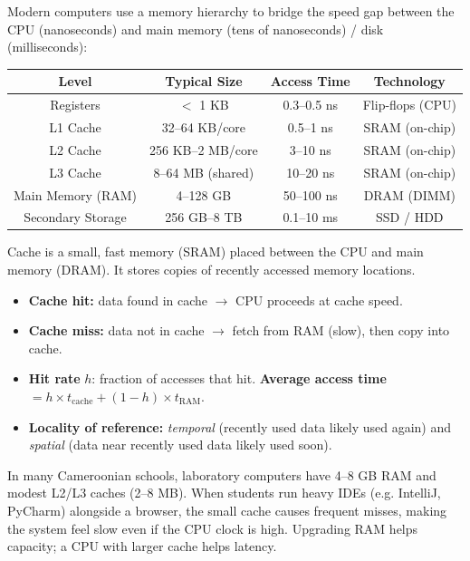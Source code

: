 \documentclass[11pt]{article}
\newcommand{\cle}[1]{{\popxbold\color{popdark}#1}}
\newcounter{popsec}
\newcounter{popsub}
\newcommand{\courssub}[1]{%
  \stepcounter{popsub}%
  \par\vspace{9pt}\noindent{\popxbold\fontsize{11.5}{13}\selectfont\color{popink}{\color{poporange}\thepopsec.\thepopsub}\hspace{6pt}#1}\par\nopagebreak\vspace{4pt}
}
\begin{document}
\courssub{Memory Hierarchy and Cache}

\begin{definition}
Modern computers use a \cle{memory hierarchy} to bridge the speed gap between the CPU (nanoseconds) and main memory (tens of nanoseconds) / disk (milliseconds):
\begin{center}
\begin{tabular}{|c|c|c|c|}
\hline
\rowcolor{popblueL} Level & Typical Size & Access Time & Technology \\ \hline
Registers & $<$ 1 KB & 0.3--0.5 ns & Flip-flops (CPU) \\ \hline
L1 Cache & 32--64 KB/core & 0.5--1 ns & SRAM (on-chip) \\ \hline
L2 Cache & 256 KB--2 MB/core & 3--10 ns & SRAM (on-chip) \\ \hline
L3 Cache & 8--64 MB (shared) & 10--20 ns & SRAM (on-chip) \\ \hline
Main Memory (RAM) & 4--128 GB & 50--100 ns & DRAM (DIMM) \\ \hline
Secondary Storage & 256 GB--8 TB & 0.1--10 ms & SSD / HDD \\ \hline
\end{tabular}
\end{center}
\end{definition}

\begin{propriete}
\cle{Cache} is a small, fast memory (SRAM) placed between the CPU and main memory (DRAM). It stores copies of recently accessed memory locations.
\begin{itemize}
\item \textbf{Cache hit:} data found in cache $\rightarrow$ CPU proceeds at cache speed.
\item \textbf{Cache miss:} data not in cache $\rightarrow$ fetch from RAM (slow), then copy into cache.
\item \textbf{Hit rate} $h$: fraction of accesses that hit. \textbf{Average access time} $= h \times t_{\text{cache}} + (1-h) \times t_{\text{RAM}}$.
\item \textbf{Locality of reference:} \emph{temporal} (recently used data likely used again) and \emph{spatial} (data near recently used data likely used soon).
\end{itemize}
\end{propriete}

\begin{savaistu}
In many Cameroonian schools, laboratory computers have 4--8 GB RAM and modest L2/L3 caches (2--8 MB). When students run heavy IDEs (e.g. IntelliJ, PyCharm) alongside a browser, the small cache causes frequent misses, making the system feel slow even if the CPU clock is high. Upgrading RAM helps capacity; a CPU with larger cache helps latency.
\end{savaistu}
\end{document}
